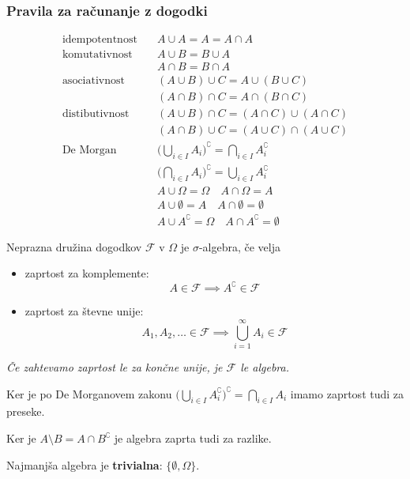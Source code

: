 \begin{multicols}{5}
\subsubsection{Pravila za računanje z dogodki}
\begin{align*}
    \text{idempotentnost} & \quad A \cup A = A = A \cap A \\
    \text{komutativnost} & \quad A \cup B = B \cup A \\
    & \quad A \cap B = B \cap A \\
    \text{asociativnost} & \quad (A \cup B) \cup C = A \cup ( B \cup C) \\
    & \quad (A \cap B) \cap C = A \cap ( B \cap C) \\
    \text{distibutivnost} & \quad (A \cup B) \cap C = (A \cap C) \cup ( A \cap C) \\
    & \quad (A \cap B) \cup C = (A \cup C) \cap ( A \cup C) \\
    \text{De Morgan} & \quad \big(\bigcup_{i\in I} A_i \big)^\complement = \bigcap_{i \in I} A_i^\complement  \\
    & \quad \big(\bigcap_{i\in I} A_i \big)^\complement = \bigcup_{i \in I} A_i^\complement \\
    & \quad A \cup \Omega = \Omega \quad  A \cap \Omega = A \\
    & \quad A \cup \emptyset = A \quad  A \cap \emptyset = \emptyset \\
    & \quad A \cup A^\complement = \Omega \quad A \cap A^\complement = \emptyset
\end{align*}


Neprazna družina dogodkov $\mathcal{F}$ v $\Omega$ je $\sigma$-algebra, če velja
\begin{itemize}
    \item zaprtost za komplemente: \[ A \in \mathcal{F} \implies A^\complement \in \mathcal{F} \]
    \item zaprtost za števne unije: \[ A_1, A_2, \dots \in \mathcal{F} \implies \bigcup_{i=1}^\infty A_i \in \mathcal{F} \]
\end{itemize}
\textit{Če zahtevamo zaprtost le za končne unije, je $\mathcal{F}$ le algebra.}

Ker je po De Morganovem zakonu $\big(\bigcup_{i\in I} A_i^\complement \big)^\complement = \bigcap_{i \in I} A_i$ imamo zaprtost tudi za preseke.

Ker je $A \setminus B = A \cap B^\complement$ je algebra zaprta tudi za razlike.

Najmanjša algebra je \textbf{trivialna}: $ \{ \emptyset, \Omega \}$.


\end{multicols}
